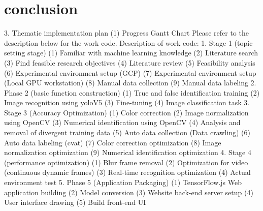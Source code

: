 \documentclass{article}
\begin{document}
\section{conclusion}
3. Thematic implementation plan
(1) Progress Gantt Chart
Please refer to the description below for the work code.
Description of work code:
1. Stage 1 (topic setting stage)
(1) Familiar with machine learning knowledge
(2) Literature search
(3) Find feasible research objectives
(4) Literature review
(5) Feasibility analysis
(6) Experimental environment setup (GCP)
(7) Experimental environment setup (Local GPU workstation)
(8) Manual data collection
(9) Manual data labeling
2. Phase 2 (basic function construction)
(1) True and false identification training
(2) Image recognition using yoloV5
(3) Fine-tuning
(4) Image classification task
3. Stage 3 (Accuracy Optimization)
(1) Color correction
(2) Image normalization using OpenCV
(3) Numerical identification using OpenCV
(4) Analysis and removal of divergent training data
(5) Auto data collection (Data crawling)
(6) Auto data labeling (cvat)
(7) Color correction optimization
(8) Image normalization optimization
(9) Numerical identification optimization
4. Stage 4 (performance optimization)
(1) Blur frame removal
(2) Optimization for video (continuous dynamic frames)
(3) Real-time recognition optimization
(4) Actual environment test
5. Phase 5 (Application Packaging)
(1) TensorFlow.js Web application building
(2) Model conversion
(3) Website back-end server setup
(4) User interface drawing
(5) Build front-end UI

\end{document}
